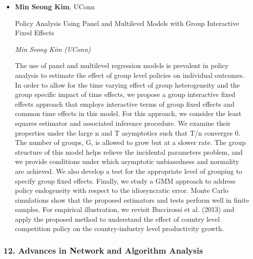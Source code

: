 \begin{itemize}
\item \textbf{Min Seong Kim}, UConn

Policy Analysis Using Panel and Multilevel Models with Group Interactive Fixed Effects

\emph{\footnotesize Min Seong Kim (UConn)}

The use of panel and multilevel regression models is prevalent in policy analysis to estimate the effect of group level policies on individual outcomes. In order to allow for the time varying effect of group heterogeneity and the group specific impact of time effects, we propose a group interactive fixed effects approach that employs interactive terms of group fixed effects and common time effects in this model. For this approach, we consider the least squares estimator and associated inference procedure. We examine their properties under the large n and T asymptotics such that T/n converges 0. The number of groups, G, is allowed to grow but at a slower rate. The group structure of this model helps relieve the incidental parameters problem, and we provide conditions under which asymptotic unbiasedness and normality are achieved. We also develop a test for the appropriate level of grouping to specify group fixed effects. Finally, we study a GMM approach to address policy endogeneity with respect to the idiosyncratic error. Monte Carlo simulations show that the proposed estimators and tests perform well in finite samples. For empirical illustration, we revisit Buccirossi et al. (2013) and apply the proposed method to understand the effect of country level competition policy on the country-industry level productivity growth.

\end{itemize}

\subsubsection*{12. Advances in Network and Algorithm Analysis}

